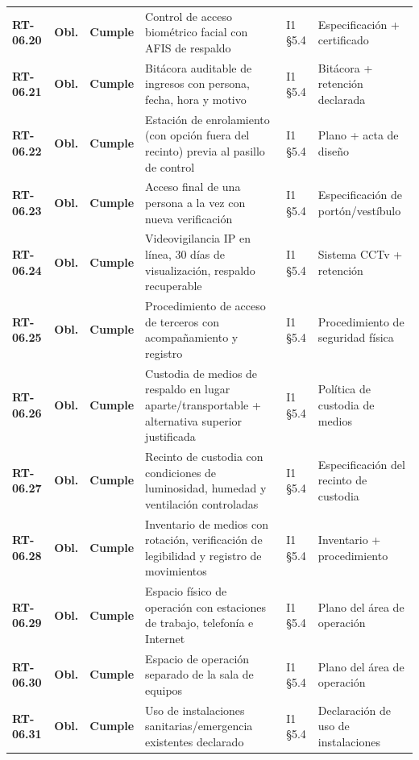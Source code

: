 \begin{small}
\begin{longtable}{@{}p{1.35cm} p{1.15cm} p{1.15cm} p{4.6cm} p{2.35cm} p{3.8cm}@{}}
\textbf{RT-06.20} & \textbf{Obl.} & \textbf{Cumple} & Control de acceso biom\'etrico facial con AFIS de respaldo & I1 §5.4 & Especificaci\'on + certificado \\
\textbf{RT-06.21} & \textbf{Obl.} & \textbf{Cumple} & Bit\'acora auditable de ingresos con persona, fecha, hora y motivo & I1 §5.4 & Bit\'acora + retenci\'on declarada \\
\textbf{RT-06.22} & \textbf{Obl.} & \textbf{Cumple} & Estaci\'on de enrolamiento (con opci\'on fuera del recinto) previa al pasillo de control & I1 §5.4 & Plano + acta de dise\~no \\
\textbf{RT-06.23} & \textbf{Obl.} & \textbf{Cumple} & Acceso final de una persona a la vez con nueva verificaci\'on & I1 §5.4 & Especificaci\'on de port\'on/vest\'ibulo \\
\textbf{RT-06.24} & \textbf{Obl.} & \textbf{Cumple} & Videovigilancia IP en l\'inea, 30 d\'ias de visualizaci\'on, respaldo recuperable & I1 §5.4 & Sistema CCTv + retenci\'on \\
\textbf{RT-06.25} & \textbf{Obl.} & \textbf{Cumple} & Procedimiento de acceso de terceros con acompa\~namiento y registro & I1 §5.4 & Procedimiento de seguridad f\'isica \\
\textbf{RT-06.26} & \textbf{Obl.} & \textbf{Cumple} & Custodia de medios de respaldo en lugar aparte/transportable + alternativa superior justificada & I1 §5.4 & Pol\'itica de custodia de medios \\
\textbf{RT-06.27} & \textbf{Obl.} & \textbf{Cumple} & Recinto de custodia con condiciones de luminosidad, humedad y ventilaci\'on controladas & I1 §5.4 & Especificaci\'on del recinto de custodia \\
\textbf{RT-06.28} & \textbf{Obl.} & \textbf{Cumple} & Inventario de medios con rotaci\'on, verificaci\'on de legibilidad y registro de movimientos & I1 §5.4 & Inventario + procedimiento \\
\textbf{RT-06.29} & \textbf{Obl.} & \textbf{Cumple} & Espacio f\'isico de operaci\'on con estaciones de trabajo, telefon\'ia e Internet & I1 §5.4 & Plano del \'area de operaci\'on \\
\textbf{RT-06.30} & \textbf{Obl.} & \textbf{Cumple} & Espacio de operaci\'on separado de la sala de equipos & I1 §5.4 & Plano del \'area de operaci\'on \\
\textbf{RT-06.31} & \textbf{Obl.} & \textbf{Cumple} & Uso de instalaciones sanitarias/emergencia existentes declarado & I1 §5.4 & Declaraci\'on de uso de instalaciones \\

\end{longtable}
\end{small}
